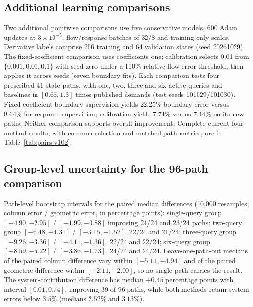 \subsection{Additional learning comparisons}\label{app:legacy-learning}\label{app:learning-protocol}\label{app:calibration-protocol}
Two additional pointwise comparisons use five conservative models, 600 Adam updates at $3\times10^{-5}$, flow/response batches of 32/8 and training-only scales. Derivative labels comprise 256 training and 64 validation states (seed 20261029). The fixed-coefficient comparison uses coefficients one; calibration selects 0.01 from $\{0.001,0.01,0.1\}$ with seed zero under a 110\% relative flow-error threshold, then applies it across seeds (seven boundary fits). Each comparison tests four prescribed 41-state paths, with one, two, three and six active queries and baselines in $[0.65,1.3]$ times published demands (test seeds 101029/101030). Fixed-coefficient boundary supervision yields 22.25\% boundary error versus 9.64\% for response supervision; calibration yields 7.74\% versus 7.44\% on its new paths. Neither comparison supports overall improvement. Complete current four-method results, with common selection and matched-path metrics, are in Table~\ref{tab:pairs-v102}.

\subsection{Group-level uncertainty for the 96-path comparison}\label{supp:learningdetail}
Path-level bootstrap intervals for the paired median differences
(10,000 resamples; column error / geometric error, in percentage
points): single-query group $[-4.90,-2.95]$ / $[-1.99,-0.88]$
improving 24/24 and 23/24 paths; two-query group $[-6.48,-4.31]$ /
$[-3.15,-1.52]$, 22/24 and 21/24; three-query group $[-9.26,-3.36]$ /
$[-4.11,-1.36]$, 22/24 and 22/24; six-query group $[-8.59,-5.22]$ /
$[-3.86,-1.73]$, 24/24 and 24/24. Leave-one-path-out medians of the
paired column difference vary within $[-5.11,-4.94]$ and of the paired
geometric difference within $[-2.11,-2.00]$, so no single path carries
the result. The system-contribution difference has median $+0.45$
percentage points with interval $[0.01,0.74]$, improving 39 of 96
paths, while both methods retain system errors below $3.5\%$ (medians
$2.52\%$ and $3.13\%$).

